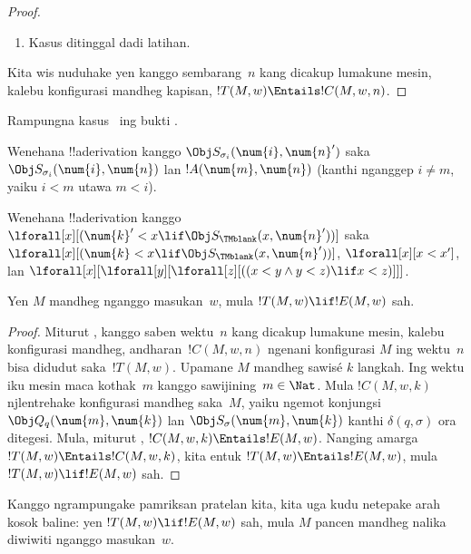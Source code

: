 \documentclass[../../../include/open-logic-section]{subfiles}
\begin{document}
\begin{proof}
\begin{enumerate}
\item Kasus  ditinggal dadi latihan.
\end{enumerate}
Kita wis nuduhake yen kanggo sembarang~$n$ kang dicakup lumakune mesin, kalebu konfigurasi mandheg kapisan,
$!T(M, w) \Entails !C(M, w, n)$.
\end{proof}

\begin{prob}
Rampungna kasus~
ing bukti .
\end{prob}

\begin{prob}
 Wenehana !!a{derivation} kanggo
$\Obj S_{\sigma_i}(\num{i}, \num{n}')$
saka $\Obj S_{\sigma_i}(\num{i}, \num{n})$
lan $!A(\num{m}, \num{n})$ (kanthi nganggep $i \neq m$,
yaiku $i < m$ utawa $m < i$).
\end{prob}

\begin{prob}
Wenehana !!a{derivation} kanggo
$\lforall[x][(\num{k}' < x \lif \Obj
  S_\TMblank(x, \num{n}'))]$ saka
$\lforall[x][(\num{k} < x \lif \Obj
  S_\TMblank(x, \num{n}'))]$,
$\lforall[x][x < x']$, lan
$\lforall[x][\lforall[y][\lforall[z][ ((x < y \land y < z) \lif x <
      z)]]]$.
\end{prob}


\begin{lem}
Yen $M$ mandheg nganggo masukan~$w$,
mula $!T(M, w) \lif !E(M, w)$ sah.
\end{lem}

\begin{proof}
Miturut , kanggo saben
wektu~$n$ kang dicakup lumakune mesin, kalebu konfigurasi mandheg, andharan~$!C(M, w, n)$
ngenani konfigurasi $M$ ing wektu~$n$
bisa didudut saka~$!T(M, w)$.
Upamane $M$ mandheg sawisé $k$ langkah.
Ing wektu iku mesin maca kothak~$m$
kanggo sawijining~$m \in \Nat$.
Mula $!C(M, w, k)$ njlentrehake
konfigurasi mandheg saka~$M$, yaiku
ngemot konjungsi $\Obj Q_q(\num{m}, \num{k})$
lan $\Obj S_\sigma(\num{m}, \num{k})$
kanthi $\delta(q,\sigma)$ ora ditegesi.
Mula, miturut ,
$!C(M, w, k) \Entails !E(M, w)$.
Nanging amarga $!T(M, w) \Entails !C(M, w, k)$,
kita entuk $!T(M, w) \Entails !E(M, w)$,
mula $!T(M, w) \lif !E(M, w)$ sah.
\end{proof}


\begin{explain} 
Kanggo ngrampungake pamriksan pratelan kita,
kita uga kudu netepake arah kosok baline:
yen $!T(M, w) \lif !E(M, w)$ sah,
mula $M$ pancen mandheg nalika diwiwiti
nganggo masukan~$w$.
\end{explain}
\end{document}
